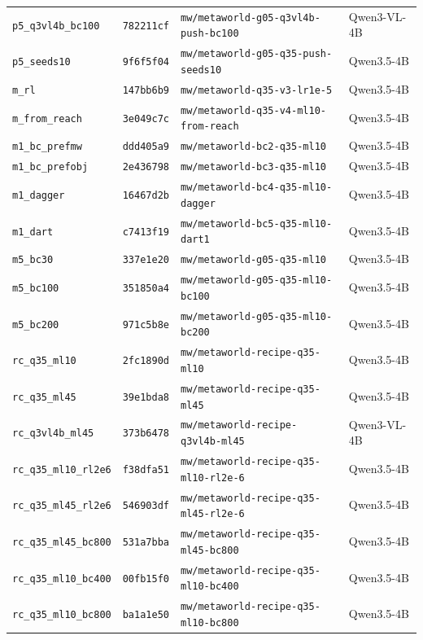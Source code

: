 \begin{longtable}{@{}llll@{}}
\texttt{p5\_q3vl4b\_bc100} & \texttt{782211cf} & \texttt{mw/metaworld-g05-q3vl4b-push-bc100} & Qwen3-VL-4B \\
\texttt{p5\_seeds10} & \texttt{9f6f5f04} & \texttt{mw/metaworld-g05-q35-push-seeds10} & Qwen3.5-4B \\
\texttt{m\_rl} & \texttt{147bb6b9} & \texttt{mw/metaworld-q35-v3-lr1e-5} & Qwen3.5-4B \\
\texttt{m\_from\_reach} & \texttt{3e049c7c} & \texttt{mw/metaworld-q35-v4-ml10-from-reach} & Qwen3.5-4B \\
\texttt{m1\_bc\_prefmw} & \texttt{ddd405a9} & \texttt{mw/metaworld-bc2-q35-ml10} & Qwen3.5-4B \\
\texttt{m1\_bc\_prefobj} & \texttt{2e436798} & \texttt{mw/metaworld-bc3-q35-ml10} & Qwen3.5-4B \\
\texttt{m1\_dagger} & \texttt{16467d2b} & \texttt{mw/metaworld-bc4-q35-ml10-dagger} & Qwen3.5-4B \\
\texttt{m1\_dart} & \texttt{c7413f19} & \texttt{mw/metaworld-bc5-q35-ml10-dart1} & Qwen3.5-4B \\
\texttt{m5\_bc30} & \texttt{337e1e20} & \texttt{mw/metaworld-g05-q35-ml10} & Qwen3.5-4B \\
\texttt{m5\_bc100} & \texttt{351850a4} & \texttt{mw/metaworld-g05-q35-ml10-bc100} & Qwen3.5-4B \\
\texttt{m5\_bc200} & \texttt{971c5b8e} & \texttt{mw/metaworld-g05-q35-ml10-bc200} & Qwen3.5-4B \\
\texttt{rc\_q35\_ml10} & \texttt{2fc1890d} & \texttt{mw/metaworld-recipe-q35-ml10} & Qwen3.5-4B \\
\texttt{rc\_q35\_ml45} & \texttt{39e1bda8} & \texttt{mw/metaworld-recipe-q35-ml45} & Qwen3.5-4B \\
\texttt{rc\_q3vl4b\_ml45} & \texttt{373b6478} & \texttt{mw/metaworld-recipe-q3vl4b-ml45} & Qwen3-VL-4B \\
\texttt{rc\_q35\_ml10\_rl2e6} & \texttt{f38dfa51} & \texttt{mw/metaworld-recipe-q35-ml10-rl2e-6} & Qwen3.5-4B \\
\texttt{rc\_q35\_ml45\_rl2e6} & \texttt{546903df} & \texttt{mw/metaworld-recipe-q35-ml45-rl2e-6} & Qwen3.5-4B \\
\texttt{rc\_q35\_ml45\_bc800} & \texttt{531a7bba} & \texttt{mw/metaworld-recipe-q35-ml45-bc800} & Qwen3.5-4B \\
\texttt{rc\_q35\_ml10\_bc400} & \texttt{00fb15f0} & \texttt{mw/metaworld-recipe-q35-ml10-bc400} & Qwen3.5-4B \\
\texttt{rc\_q35\_ml10\_bc800} & \texttt{ba1a1e50} & \texttt{mw/metaworld-recipe-q35-ml10-bc800} & Qwen3.5-4B \\

\end{longtable}
